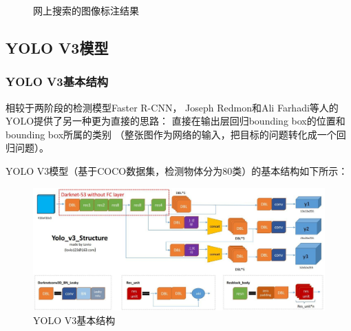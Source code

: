 \documentclass[UTF8]{ctexart}
\begin{document}
\begin{figure}[htbp]
    \centering
    \hspace{0.5in}
    \hspace{0.5in}
    \caption{网上搜索的图像标注结果}
\end{figure}

\newpage
\subsection{YOLO V3模型}

\subsubsection{YOLO V3基本结构}
相较于两阶段的检测模型Faster R-CNN，
Joseph Redmon和Ali Farhadi等人的YOLO提供了另一种更为直接的思路： 
直接在输出层回归bounding box的位置和bounding box所属的类别
（整张图作为网络的输入，把目标的问题转化成一个回归问题）。

YOLO V3模型（基于COCO数据集，检测物体分为80类）的基本结构如下所示：

\begin{figure}[htbp]
    \centering
    \includegraphics[width=1.0\textwidth]{../img/YOLOv3.png}
    \caption{YOLO V3基本结构}
\end{figure}
\end{document}
